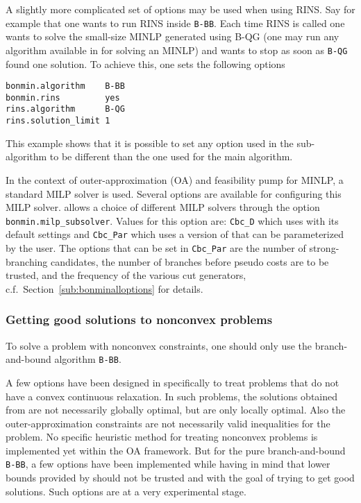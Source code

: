 A slightly more complicated set of options may be used when using RINS.
Say for example that one wants to run RINS inside \texttt{B-BB}.
Each time RINS is called one wants to solve the small-size MINLP generated using B-QG (one may run any algorithm available in \BONMIN for solving an MINLP) and wants to stop as soon as \texttt{B-QG} found one solution.
To achieve this, one sets the following options
\begin{verbatim}
bonmin.algorithm    B-BB
bonmin.rins         yes
rins.algorithm      B-QG
rins.solution_limit 1
\end{verbatim}
This example shows that it is possible to set any option used in the sub-algorithm to be different than the one used for the main algorithm.

In the context of outer-approximation (OA) and feasibility pump for MINLP, a standard MILP solver is used.
Several options are available for configuring this MILP solver.
\BONMIN allows a choice of different MILP solvers through the option
\texttt{bonmin.milp\_sub\-sol\-ver}. Values for this option are: {\tt Cbc\_D} which uses \CBC with its
default settings and {\tt Cbc\_Par} which uses a version of \CBC that can be parameterized by the user.
The options that can be set in {\tt Cbc\_Par} are the number of strong-branching candidates,
the number of branches before pseudo costs are to be trusted, and the frequency of the various cut generators, c.f.\ Section~\ref{sub:bonminalloptions} for details.

\subsubsection{Getting good solutions to nonconvex problems}
To solve a problem with nonconvex constraints, one should only use the branch-and-bound algorithm {\tt B-BB}.

A few options have been designed in \BONMIN specifically to treat
problems that do not have a convex continuous relaxation.
In such problems, the solutions obtained from \IPOPT are
not necessarily globally optimal, but are only locally optimal.
Also the outer-approximation constraints are not necessarily valid inequalities for the problem.
No specific heuristic method for treating nonconvex problems is implemented
yet within the OA framework.
But for the pure branch-and-bound {\tt B-BB}, a few options have been implemented while having
in mind that lower bounds provided by \IPOPT should not be trusted and with the goal of
trying to get good solutions. Such options are at a very experimental stage.

